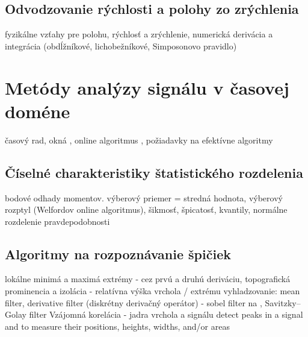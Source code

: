
\subsection{Odvodzovanie rýchlosti a polohy zo zrýchlenia}
fyzikálne vzťahy pre polohu, rýchlosť a zrýchlenie, numerická derivácia a integrácia (obdĺžníkové, lichobežníkové, Simposonovo pravidlo) \cite{integration-acceleration-envelopes}

\section{Metódy analýzy signálu v časovej doméne}
časový rad, okná
\cite{time-series-analysis} \cite{practical-time-series} \cite{generalized-esd} \cite{twitter-esd}, 
online algoritmus \cite{online-anomaly-detection}, 
požiadavky na efektívne algoritmy
	

\subsection{Číselné charakteristiky štatistického rozdelenia}
bodové odhady momentov. výberový priemer = stredná hodnota, výberový rozptyl (Welfordov online algoritmus), šikmosť, špicatosť, kvantily, normálne rozdelenie pravdepodobnosti


\subsection{Algoritmy na rozpoznávanie špičiek}
lokálne minimá a maximá extrémy - cez prvú a druhú deriváciu,
topografická prominencia a izolácia - relatívna výška vrchola / extrému
vyhladzovanie: mean filter, derivative filter (diskrétny derivačný operátor) - sobel filter na , Savitzky–Golay filter
Vzájomná korelácia - jadra vrchola a signálu
detect peaks in a signal and to measure their positions, heights, widths, and/or areas


